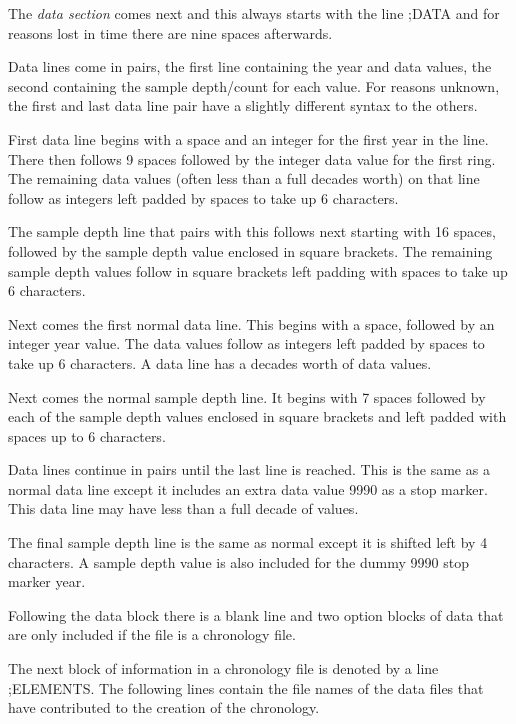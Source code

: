 The \emph{data section} comes next and this always starts with the line ;DATA and for reasons lost in time there are nine spaces afterwards.

Data lines come in pairs, the first line containing the year and data values, the second containing the sample depth/count for each value. For reasons unknown, the first and last data line pair have a slightly different syntax to the others. 

\begin{itemize*}
 \item First data line begins with a space and an integer for the first year in the line. There then follows 9 spaces followed by the integer data value for the first ring. The remaining data values (often less than a full decades worth) on that line follow as integers left padded by spaces to take up 6 characters.
\item  The sample depth line that pairs with this follows next starting with 16 spaces, followed by the sample depth value enclosed in square brackets. The remaining sample depth values follow in square brackets left padding with spaces to take up 6 characters.
\item  Next comes the first normal data line. This begins with a space, followed by an integer year value. The data values follow as integers left padded by spaces to take up 6 characters. A data line has a decades worth of data values.
\item  Next comes the normal sample depth line. It begins with 7 spaces followed by each of the sample depth values enclosed in square brackets and left padded with spaces up to 6 characters.
\item  Data lines continue in pairs until the last line is reached. This is the same as a normal data line except it includes an extra data value 9990 as a stop marker. This data line may have less than a full decade of values.
\item  The final sample depth line is the same as normal except it is shifted left by 4 characters. A sample depth value is also included for the dummy 9990 stop marker year. 
\end{itemize*}

Following the data block there is a blank line and two option blocks of data that are only included if the file is a chronology file.

The next block of information in a chronology file is denoted by a line ;ELEMENTS. The following lines contain the file names of the data files that have contributed to the creation of the chronology.


